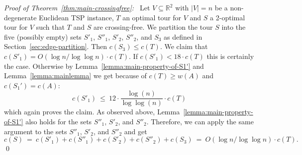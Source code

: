 \documentclass[a4paper, 11pt]{article}
\def\blue#1{#1}
\begin{document}
\noindent
\textit{Proof of Theorem~\ref{thm:main-crossingfree}:~}
Let $V\subseteq \mathbb{R}^2$ with $|V| = n$ be a non-degenerate Euclidean TSP instance, 
$T$ an optimal tour for $V$ and $S$ a 2-optimal tour for $V$ such that $T$ and $S$ are crossing-free.
We partition the tour $S$ into the five (possibly empty) sets $S'_1$, $S''_1$, $S'_2$, $S''_2$, and $S_3$ as defined in Section~\ref{sec:edge-partition}.
Then $c(S_3) \le c(T)$. We claim that $c(S'_1) = O(\log n / \log \log n) \cdot c(T)$.
If $c(S'_1) < 18 \cdot c(T)$ this is certainly the case. Otherwise by Lemma~\ref{lemma:main-property-of-S1'} and 
Lemma~\ref{lemma:mainlemma} we get \blue{because of $c(T) \ge w(A)$ and $c(S_1') = c(A)$:}  
\[c(S'_1) ~\le~ 12\cdot \frac{\log(n)}{\log \log (n)}\cdot c(T) \]
which again proves the claim. As observed above, Lemma~\ref{lemma:main-property-of-S1'} also holds for the sets $S''_1$, $S'_2$, and $S''_2$. 
Therefore, we can apply the same argument to the sets $S''_1$, $S'_2$, and $S''_2$ and get
\[c(S) ~=~ c(S'_1) + c(S''_1) + c(S'_2) + c(S''_2) + c(S_3) ~=~  O(\log n / \log \log n) \cdot c(T).\]
\qed
\end{document}
